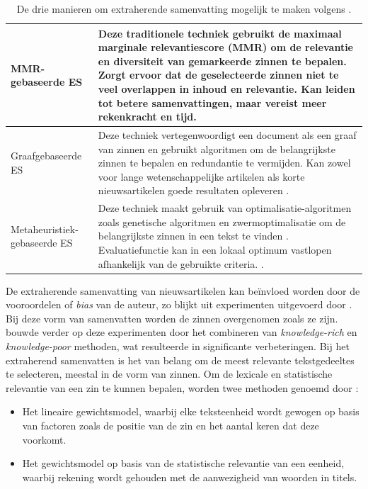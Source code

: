 \begin{center}
	\begin{table}[H]
	\begin{tabular}{ | m{4cm} | m{12cm} | } 
		\hline
		MMR-gebaseerde ES & Deze traditionele techniek gebruikt de maximaal marginale relevantiescore (MMR) om de relevantie en diversiteit van gemarkeerde zinnen te bepalen. Zorgt ervoor dat de geselecteerde zinnen niet te veel overlappen in inhoud en relevantie. Kan leiden tot betere samenvattingen, maar vereist meer rekenkracht en tijd. \\
		\hline
		Graafgebaseerde ES & Deze techniek vertegenwoordigt een document als een graaf van zinnen en gebruikt algoritmen om de belangrijkste zinnen te bepalen en redundantie te vermijden. Kan zowel voor lange wetenschappelijke artikelen als korte nieuwsartikelen goede resultaten opleveren \autocite{McDonald2007, Lin2010}. \\ 
		\hline
		Metaheuristiek-gebaseerde ES & Deze techniek maakt gebruik van optimalisatie-algoritmen zoals genetische algoritmen en zwermoptimalisatie om de belangrijkste zinnen in een tekst te vinden \autocite{Premjith2015, Verma2020}. Evaluatiefunctie kan in een lokaal optimum vastlopen afhankelijk van de gebruikte criteria. \autocite{Rani2021}. \\
		\hline
	\end{tabular}
	\label{table:extractive-summarization}
	\caption{De drie manieren om extraherende samenvatting mogelijk te maken volgens \textcite{Verma2020}.}
	\end{table}
\end{center}

\medspace

De extraherende samenvatting van nieuwsartikelen kan beïnvloed worden door de vooroordelen of \textit{bias} van de auteur, zo blijkt uit experimenten uitgevoerd door \textcite{McKeown1999}. Bij deze vorm van samenvatten worden de zinnen overgenomen zoals ze zijn. \textcite{Hahn2000} bouwde verder op deze experimenten door het combineren van \textit{knowledge-rich} en \textit{knowledge-poor} methoden, wat resulteerde in significante verbeteringen. Bij het extraherend samenvatten is het van belang om de meest relevante tekstgedeeltes te selecteren, meestal in de vorm van zinnen. Om de lexicale en statistische relevantie van een zin te kunnen bepalen, worden twee methoden genoemd door \textcite{Hahn2000}:

\begin{itemize}
	\item Het lineaire gewichtsmodel, waarbij elke teksteenheid wordt gewogen op basis van factoren zoals de positie van de zin en het aantal keren dat deze voorkomt.
	\item Het gewichtsmodel op basis van de statistische relevantie van een eenheid, waarbij rekening wordt gehouden met de aanwezigheid van woorden in titels.
\end{itemize}

